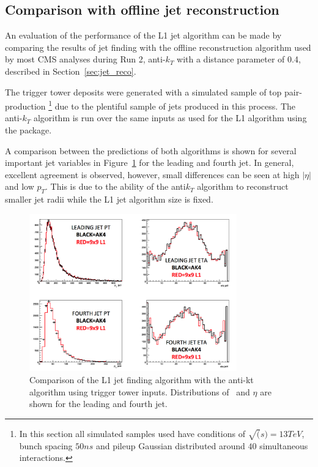 \subsection{Comparison with offline jet reconstruction}

An evaluation of the performance of the L1 jet algorithm can be made by comparing
the results of jet finding with the offline reconstruction algorithm used by 
most CMS analyses during Run 2, anti-$k_T$ with a distance
parameter of 0.4, described in Section~\ref{sec:jet_reco}. 

The trigger tower deposits were generated with a simulated sample of top pair-production \footnote{In this section all simulated samples used have conditions 
of $\sqrt(s) = 13TeV$, bunch spacing $50ns$ and pileup Gaussian distributed around $40$ simultaneous interactions.} 
due to the plentiful sample of jets produced in this process. The anti-$k_T$ algorithm is run over the same inputs as
used for the L1 algorithm using the \FASTJET package.

A comparison between the predictions of both algorithms is shown for several important jet variables in 
Figure~\ref{fig:jet_l1s2_compak4} for the leading and fourth jet. In general, excellent agreement is observed, however,
small differences can be seen at high $|\eta|$ and low $p_T$. This is due to the ability 
of the anti$k_T$ algorithm to reconstruct smaller jet radii while the L1 jet
algorithm size is fixed.


\begin{figure}
\centering
    \includegraphics[width=0.8\textwidth]{./Figures/triggerUpgrade/jet_l1s2_compak4}
  \caption{Comparison of the L1 jet finding algorithm with the anti-kt algorithm using
  trigger tower inputs. Distributions of \pt~and $\eta$ are shown for the leading and fourth
  jet.}
  \label{fig:jet_l1s2_compak4}
\end{figure}  
